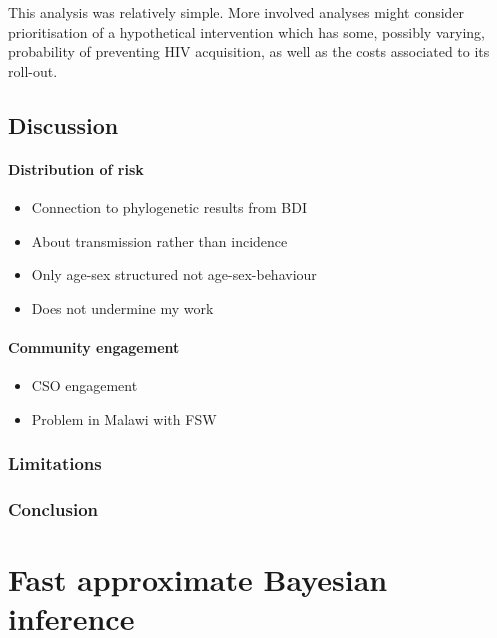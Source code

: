 \documentclass[a4paper, nobind]{templates/ociamthesis}
\providecommand{\tightlist}{%
  \setlength{\itemsep}{0pt}\setlength{\parskip}{0pt}}
\begin{document}
This analysis was relatively simple.
More involved analyses might consider prioritisation of a hypothetical intervention which has some, possibly varying, probability of preventing HIV acquisition, as well as the costs associated to its roll-out.

\hypertarget{discussion-1}{%
\section{Discussion}\label{discussion-1}}

\hypertarget{distribution-of-risk}{%
\subsubsection{Distribution of risk}\label{distribution-of-risk}}

\begin{itemize}
\tightlist
\item
  Connection to phylogenetic results from BDI
\item
  About transmission rather than incidence
\item
  Only age-sex structured not age-sex-behaviour
\item
  Does not undermine my work
\end{itemize}

\hypertarget{community-engagement}{%
\subsubsection{Community engagement}\label{community-engagement}}

\begin{itemize}
\tightlist
\item
  CSO engagement
\item
  Problem in Malawi with FSW
\end{itemize}

\hypertarget{limitations-1}{%
\subsection{Limitations}\label{limitations-1}}

\hypertarget{conclusion-1}{%
\subsection{Conclusion}\label{conclusion-1}}

\hypertarget{naomi-aghq}{%
\chapter{Fast approximate Bayesian inference}\label{naomi-aghq}}
\end{document}
